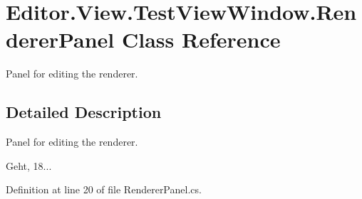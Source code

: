 \section{Editor.\-View.\-Test\-View\-Window.\-Renderer\-Panel Class Reference}
\label{class_editor_1_1_view_1_1_test_view_window_1_1_renderer_panel}


Panel for editing the renderer.  




\subsection{Detailed Description}
Panel for editing the renderer. 

Geht, 18... 

Definition at line 20 of file Renderer\-Panel.\-cs.

